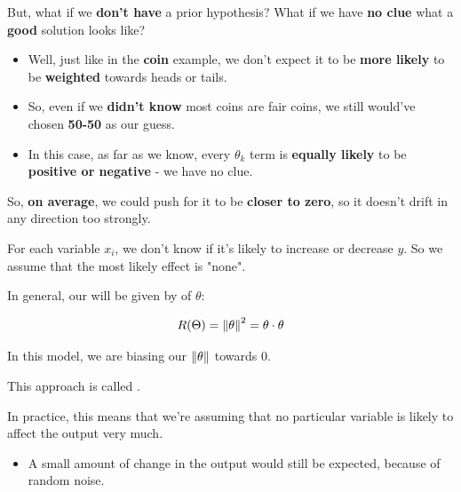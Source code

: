        But, what if we \textbf{don't have} a prior hypothesis? What if we have \textbf{no clue} what a \textbf{good} solution looks like?

        \begin{itemize}
            \item Well, just like in the \textbf{coin} example, we don't expect it to be \textbf{more likely} to be \textbf{weighted} towards heads or tails.

            \item So, even if we \textbf{didn't know} most coins are fair coins, we still would've chosen \textbf{50-50} as our guess.

            \item In this case, as far as we know, every $\theta_k$ term is \textbf{equally likely} to be \textbf{positive or negative} - we have no clue.
        \end{itemize}
        
        So, \textbf{on average}, we could push for it to be \textbf{closer to zero}, so it doesn't drift in any direction too strongly.
        
        For each variable $x_i$, we don't know if it's likely to increase or decrease $y$. So we assume that the most likely effect is "none".\\
        
        \begin{kequation}
            In general, our  will be given by  of $\theta$:
            
            \begin{equation*}
                R(\Theta) = \left\lVert\theta\right\rVert^2 = \theta \cdot \theta
            \end{equation*}

            In this model, we are biasing our $\left\lVert\theta\right\rVert$ towards 0.
            
            This approach is called .
        \end{kequation}
        

        In practice, this means that we're assuming that no particular variable is likely to affect the output very much.

        \begin{itemize}
            \item A small amount of change in the output would still be expected, because of random noise.
        \end{itemize}

